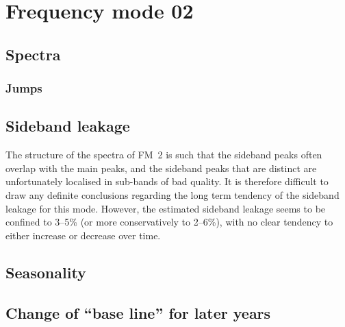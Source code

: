 \section{Frequency mode 02}
\subsection{Spectra}
\subsubsection{Jumps}

\subsection{Sideband leakage}
The structure of the spectra of FM~2 is such that the sideband peaks often
overlap with the main peaks, and the sideband peaks that are distinct are
unfortunately localised in sub-bands of bad quality. It is therefore difficult
to draw any definite conclusions regarding the long term tendency of the
sideband leakage for this mode. However, the estimated sideband leakage seems
to be confined to 3--5\% (or more conservatively to 2--6\%), with no clear
tendency to either increase or decrease over time.

\subsection{Seasonality}
\subsection{Change of ``base line'' for later years}
